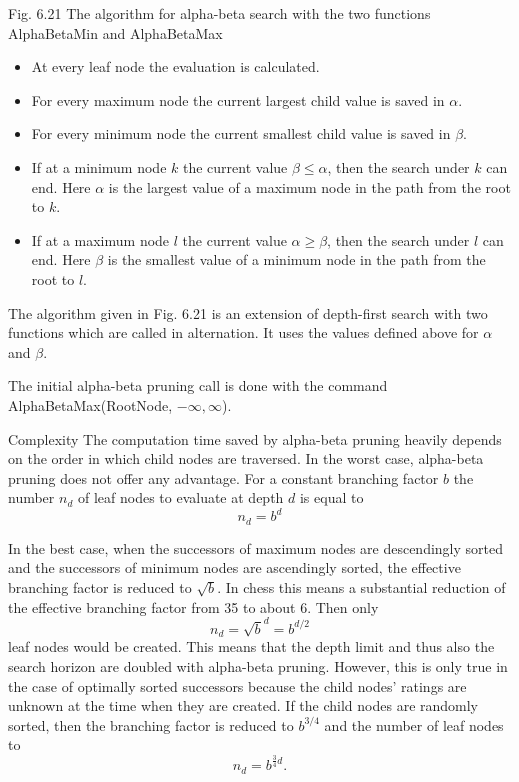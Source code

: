 \documentclass[10pt]{book}
\begin{document}
Fig. 6.21 The algorithm for alpha-beta search with the two functions AlphaBetaMin and AlphaBetaMax

\begin{itemize}
  \item At every leaf node the evaluation is calculated.
  \item For every maximum node the current largest child value is saved in $\alpha$.
  \item For every minimum node the current smallest child value is saved in $\beta$.
  \item If at a minimum node $k$ the current value $\beta \leq \alpha$, then the search under $k$ can end. Here $\alpha$ is the largest value of a maximum node in the path from the root to $k$.
  \item If at a maximum node $l$ the current value $\alpha \geq \beta$, then the search under $l$ can end. Here $\beta$ is the smallest value of a minimum node in the path from the root to $l$.
\end{itemize}
The algorithm given in Fig. 6.21 is an extension of depth-first search with two functions which are called in alternation. It uses the values defined above for $\alpha$ and $\beta$.

The initial alpha-beta pruning call is done with the command\\
AlphaBetaMax(RootNode, $-\infty, \infty$).

Complexity The computation time saved by alpha-beta pruning heavily depends on the order in which child nodes are traversed. In the worst case, alpha-beta pruning does not offer any advantage. For a constant branching factor $b$ the number $n_{d}$ of leaf nodes to evaluate at depth $d$ is equal to
$$
n_{d}=b^{d}
$$

In the best case, when the successors of maximum nodes are descendingly sorted and the successors of minimum nodes are ascendingly sorted, the effective branching factor is reduced to $\sqrt{b}$. In chess this means a substantial reduction of the effective branching factor from 35 to about 6. Then only
$$
n_{d}=\sqrt{b}^{d}=b^{d / 2}
$$
leaf nodes would be created. This means that the depth limit and thus also the search horizon are doubled with alpha-beta pruning. However, this is only true in the case of optimally sorted successors because the child nodes' ratings are unknown at the time when they are created. If the child nodes are randomly sorted, then the branching factor is reduced to $b^{3 / 4}$ and the number of leaf nodes to
$$
n_{d}=b^{\frac{3}{4} d}.
$$
\end{document}
